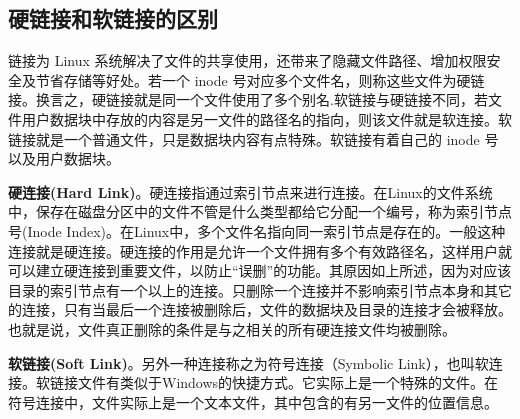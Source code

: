 \documentclass[../../../interview-questions.tex]{subfiles}
\begin{document}
\subsection{硬链接和软链接的区别}

链接为 Linux 系统解决了文件的共享使用，还带来了隐藏文件路径、增加权限安全及节省存储等好处。若一个 inode 号对应多个文件名，则称这些文件为硬链接。换言之，硬链接就是同一个文件使用了多个别名.软链接与硬链接不同，若文件用户数据块中存放的内容是另一文件的路径名的指向，则该文件就是软连接。软链接就是一个普通文件，只是数据块内容有点特殊。软链接有着自己的 inode 号以及用户数据块。

\textbf{硬连接(Hard Link)}。硬连接指通过索引节点来进行连接。在Linux的文件系统中，保存在磁盘分区中的文件不管是什么类型都给它分配一个编号，称为索引节点号(Inode Index)。在Linux中，多个文件名指向同一索引节点是存在的。一般这种连接就是硬连接。硬连接的作用是允许一个文件拥有多个有效路径名，这样用户就可以建立硬连接到重要文件，以防止“误删”的功能。其原因如上所述，因为对应该目录的索引节点有一个以上的连接。只删除一个连接并不影响索引节点本身和其它的连接，只有当最后一个连接被删除后，文件的数据块及目录的连接才会被释放。也就是说，文件真正删除的条件是与之相关的所有硬连接文件均被删除。

\textbf{软链接(Soft Link)}。另外一种连接称之为符号连接（Symbolic Link），也叫软连接。软链接文件有类似于Windows的快捷方式。它实际上是一个特殊的文件。在符号连接中，文件实际上是一个文本文件，其中包含的有另一文件的位置信息。
\end{document}
